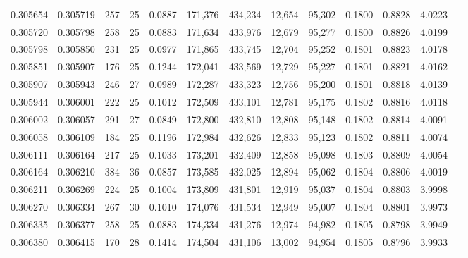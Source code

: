 \begin{tabular}{rrrrrrrrrrrrr}
0.305654 & 0.305719 &   257 &  25 &                                     0.0887 & 171,376 & 434,234 &  12,654 &  95,302 & 0.1800 & 0.8828 & 4.0223 \\
0.305720 & 0.305798 &   258 &  25 &                                     0.0883 & 171,634 & 433,976 &  12,679 &  95,277 & 0.1800 & 0.8826 & 4.0199 \\
0.305798 & 0.305850 &   231 &  25 &                                     0.0977 & 171,865 & 433,745 &  12,704 &  95,252 & 0.1801 & 0.8823 & 4.0178 \\
0.305851 & 0.305907 &   176 &  25 &                                     0.1244 & 172,041 & 433,569 &  12,729 &  95,227 & 0.1801 & 0.8821 & 4.0162 \\
0.305907 & 0.305943 &   246 &  27 &                                     0.0989 & 172,287 & 433,323 &  12,756 &  95,200 & 0.1801 & 0.8818 & 4.0139 \\
0.305944 & 0.306001 &   222 &  25 &                                     0.1012 & 172,509 & 433,101 &  12,781 &  95,175 & 0.1802 & 0.8816 & 4.0118 \\
0.306002 & 0.306057 &   291 &  27 &                                     0.0849 & 172,800 & 432,810 &  12,808 &  95,148 & 0.1802 & 0.8814 & 4.0091 \\
0.306058 & 0.306109 &   184 &  25 &                                     0.1196 & 172,984 & 432,626 &  12,833 &  95,123 & 0.1802 & 0.8811 & 4.0074 \\
0.306111 & 0.306164 &   217 &  25 &                                     0.1033 & 173,201 & 432,409 &  12,858 &  95,098 & 0.1803 & 0.8809 & 4.0054 \\
0.306164 & 0.306210 &   384 &  36 &                                     0.0857 & 173,585 & 432,025 &  12,894 &  95,062 & 0.1804 & 0.8806 & 4.0019 \\
0.306211 & 0.306269 &   224 &  25 &                                     0.1004 & 173,809 & 431,801 &  12,919 &  95,037 & 0.1804 & 0.8803 & 3.9998 \\
0.306270 & 0.306334 &   267 &  30 &                                     0.1010 & 174,076 & 431,534 &  12,949 &  95,007 & 0.1804 & 0.8801 & 3.9973 \\
0.306335 & 0.306377 &   258 &  25 &                                     0.0883 & 174,334 & 431,276 &  12,974 &  94,982 & 0.1805 & 0.8798 & 3.9949 \\
0.306380 & 0.306415 &   170 &  28 &                                     0.1414 & 174,504 & 431,106 &  13,002 &  94,954 & 0.1805 & 0.8796 & 3.9933 \\

\end{tabular}
